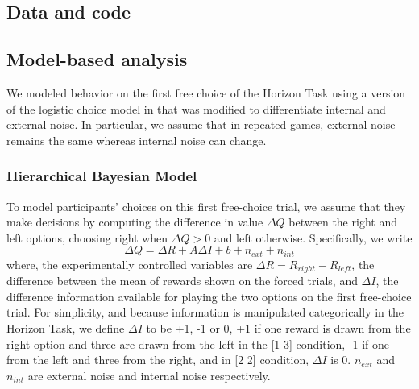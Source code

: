 \documentclass[12pt]{article}
\begin{document}
	
	\subsection*{Data and code}
	
	
	\subsection*{Model-based analysis}
	We modeled behavior on the first free choice of the Horizon Task using a version of the logistic choice model in \citep{wilson2014} that was modified to differentiate internal and external noise. In particular, we assume that in repeated games, external noise remains the same whereas internal noise can change. 
	
	\subsubsection*{Hierarchical Bayesian Model}
	
	To model participants' choices on this first free-choice trial, we assume that they make decisions by computing the difference in value $\Delta Q$ between the right and left options, choosing right when $\Delta Q > 0$ and left otherwise.  Specifically, we write
	\begin{equation}
	\Delta Q= \Delta R+A \Delta    I+b+n_{ext}+n_{int}
	\end{equation}
	where, the experimentally controlled variables are $\Delta R=R_{right}-R_{left}$, the difference between the mean of rewards shown on the forced trials, and $\Delta I$, the difference information available for playing the two options on the first free-choice trial. For simplicity, and because information is manipulated categorically in the Horizon Task, we define $\Delta I$ to be +1, -1 or 0, +1 if one reward is drawn from the right option and three are drawn from the left in the [1 3] condition, -1 if one from the left and three from the right, and in [2 2] condition, $\Delta I$ is 0. $n_{ext}$ and $n_{int}$ are external noise and internal noise respectively. 
	
\end{document}
